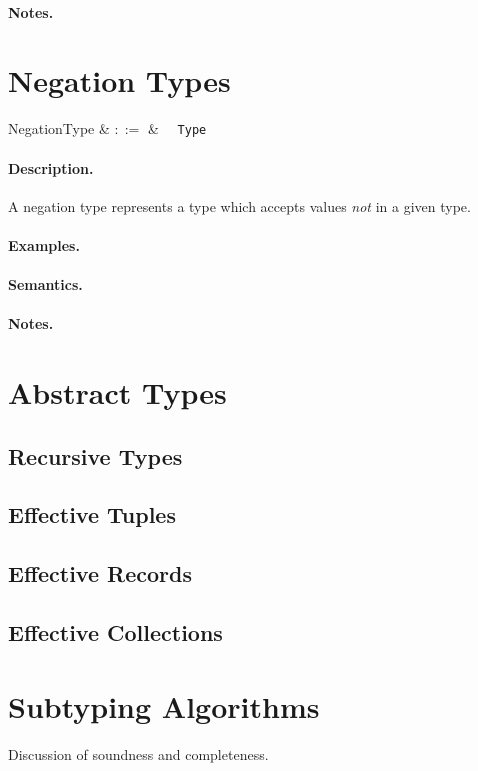 \paragraph{Notes.}


\section{Negation Types}

\begin{syntax}
  NegationType & $::=$ & \token{!}\ \ \verb+Type+\\
\end{syntax}

\paragraph{Description.}  A negation type represents a type which
accepts values {\em not} in a given type.

\paragraph{Examples.}

\paragraph{Semantics.}

\paragraph{Notes.}

\section{Abstract Types}
\subsection{Recursive Types}
\subsection{Effective Tuples}
\subsection{Effective Records}
\subsection{Effective Collections}

\section{Subtyping Algorithms}
Discussion of soundness and completeness.
